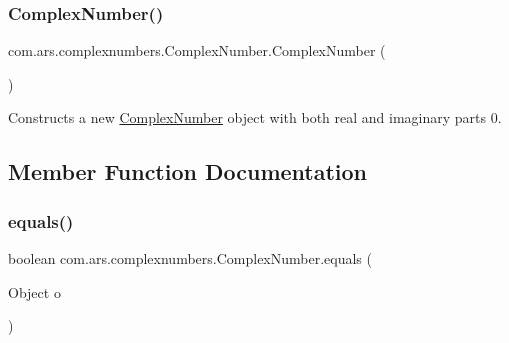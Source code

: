 \subsubsection{\texorpdfstring{Complex\+Number()}{ComplexNumber()}\hspace{0.1cm}{\footnotesize\ttfamily [2/2]}}
{\footnotesize\ttfamily com.\+ars.\+complexnumbers.\+Complex\+Number.\+Complex\+Number (\begin{DoxyParamCaption}{ }\end{DoxyParamCaption})}

Constructs a new {\ttfamily \hyperlink{classcom_1_1ars_1_1complexnumbers_1_1_complex_number}{Complex\+Number}} object with both real and imaginary parts 0. 

\subsection{Member Function Documentation}
\hypertarget{classcom_1_1ars_1_1complexnumbers_1_1_complex_number_a8dd0d197e07c92cb3f7e98697a18d96f}{}\label{classcom_1_1ars_1_1complexnumbers_1_1_complex_number_a8dd0d197e07c92cb3f7e98697a18d96f} 
\subsubsection{\texorpdfstring{equals()}{equals()}}
{\footnotesize\ttfamily boolean com.\+ars.\+complexnumbers.\+Complex\+Number.\+equals (\begin{DoxyParamCaption}\item[{Object}]{o }\end{DoxyParamCaption})}

